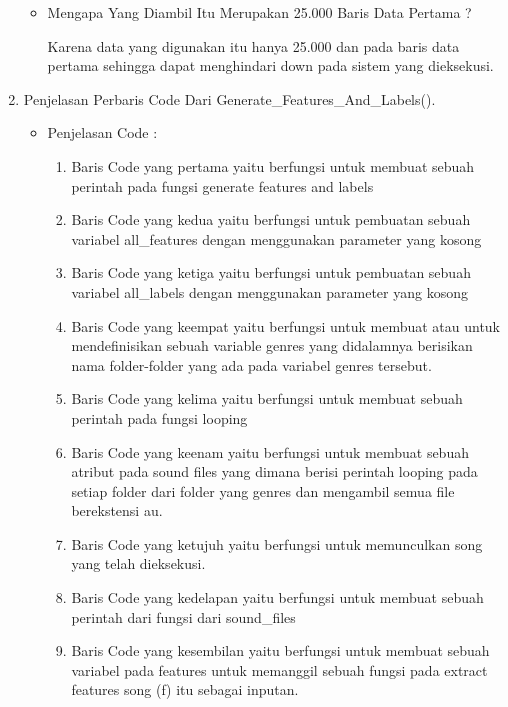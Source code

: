 \begin{enumerate}
\begin{itemize}
\par
\item Mengapa Yang Diambil Itu Merupakan 25.000 Baris Data Pertama ?
\par Karena data yang digunakan itu hanya 25.000 dan pada baris data pertama sehingga dapat menghindari down pada sistem yang dieksekusi.
\par
\end{itemize}
\par
\par
\par
\par
\par
\par
\par
\item Penjelasan Perbaris Code Dari Generate\_Features\_And\_Labels().
\begin{itemize}
\item Penjelasan Code :
\begin{enumerate}
\item Baris Code yang pertama yaitu berfungsi untuk membuat sebuah perintah pada fungsi generate features and labels
\item Baris Code yang kedua yaitu berfungsi untuk pembuatan sebuah variabel all\_features dengan menggunakan parameter yang kosong
\item Baris Code yang ketiga yaitu berfungsi untuk pembuatan sebuah variabel all\_labels dengan menggunakan parameter yang kosong
\item Baris Code yang keempat yaitu berfungsi untuk membuat atau untuk mendefinisikan sebuah variable genres yang didalamnya berisikan nama folder-folder yang ada pada variabel genres tersebut.
\item Baris Code yang kelima yaitu berfungsi untuk membuat sebuah perintah pada fungsi looping
\item Baris Code yang keenam yaitu berfungsi untuk membuat sebuah atribut pada sound files yang dimana berisi perintah looping pada setiap folder dari folder yang genres dan mengambil semua file berekstensi au.
\item Baris Code yang ketujuh yaitu berfungsi untuk memunculkan song yang telah dieksekusi.
\item Baris Code yang kedelapan yaitu berfungsi untuk membuat sebuah perintah dari fungsi dari sound\_files
\item Baris Code yang kesembilan yaitu berfungsi untuk membuat sebuah variabel pada features untuk memanggil sebuah fungsi pada extract features song (f) itu sebagai inputan.

\end{enumerate}
\end{itemize}
\end{enumerate}
